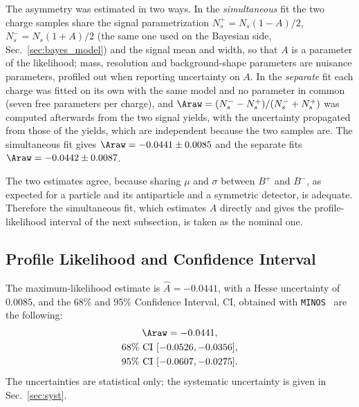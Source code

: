 The asymmetry was estimated in two ways. In the \emph{simultaneous} fit the two charge samples share the signal parametrization $N_s^+=N_s(1-A)/2$, $N_s^-=N_s(1+A)/2$ (the same one used on the Bayesian side, Sec.~\ref{sec:bayes_model}) and the signal mean and width, so that $A$ is a parameter of the likelihood; mass, resolution and background-shape parameters are nuisance parameters, profiled out when reporting uncertainty on $A$. In the \emph{separate} fit each charge was fitted on its own with the same model and no parameter in common (seven free parameters per charge), and $\Araw=(N_s^--N_s^+)/(N_s^-+N_s^+)$ was computed afterwards from the two signal yields, with the uncertainty propagated from those of the yields, which are independent because the two samples are. The simultaneous fit gives $\Araw=-0.0441\pm0.0085$ and the separate fits $\Araw=-0.0442\pm0.0087$.

The two estimates agree, because sharing $\mu$ and $\sigma$ between $B^+$ and $B^-$, as expected for a particle and its antiparticle and a symmetric detector, is adequate.
Therefore the simultaneous fit, which estimates $A$ directly and gives the profile-likelihood interval of the next subsection, is taken as the nominal one.

\subsection{Profile Likelihood and Confidence Interval}
\label{sec:freq_ci}


The maximum-likelihood estimate is $\hat A=-0.0441$, with a Hesse uncertainty of $0.0085$, and the 68\% and 95\% Confidence Interval, CI, obtained with \texttt{MINOS}~\cite{minuit} are the following:
\begin{gather*}
\Araw = -0.0441, \\
68\%~\text{CI}~[-0.0526, -0.0356], \\ 95\%~\text{CI}~[-0.0607, -0.0275].
\end{gather*}
The uncertainties are statistical only; the systematic uncertainty is given in Sec.~\ref{sec:syst}.

